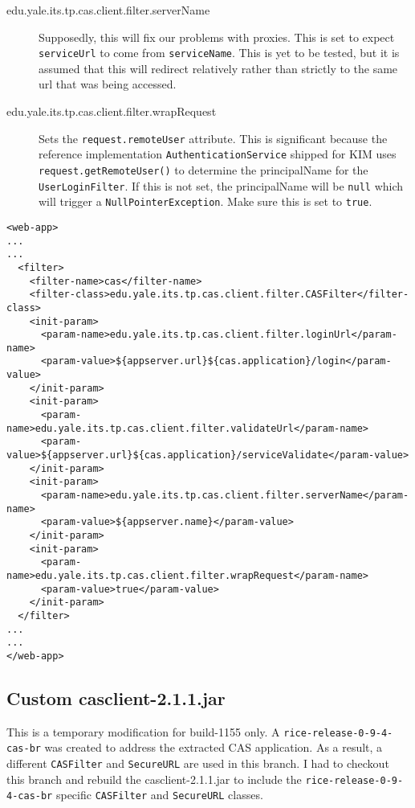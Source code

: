 \documentclass[12pt,notitlepage]{article}
\begin{document}
\begin{description}
  \item[edu.yale.its.tp.cas.client.filter.serverName] Supposedly, this will fix our problems
    with proxies. This is set to expect \verb|serviceUrl| to come from \verb|serviceName|. 
    This is yet to be tested, but it is assumed that this will redirect relatively rather than
    strictly to the same url that was being accessed.
  \item[edu.yale.its.tp.cas.client.filter.wrapRequest] Sets the \verb|request.remoteUser| attribute.
    This is significant because the reference implementation \verb|AuthenticationService| shipped
    for KIM uses \verb|request.getRemoteUser()| to determine the principalName for the \verb|UserLoginFilter|.
    If this is not set, the principalName will be \verb|null| which will trigger a 
    \verb|NullPointerException|. Make sure this is set to \verb|true|.
\end{description}

\begin{lstlisting}
<web-app>
...
...
  <filter>
	<filter-name>cas</filter-name>
	<filter-class>edu.yale.its.tp.cas.client.filter.CASFilter</filter-class>
	<init-param>
	  <param-name>edu.yale.its.tp.cas.client.filter.loginUrl</param-name>
	  <param-value>${appserver.url}${cas.application}/login</param-value>
	</init-param>
	<init-param>
	  <param-name>edu.yale.its.tp.cas.client.filter.validateUrl</param-name>
	  <param-value>${appserver.url}${cas.application}/serviceValidate</param-value>
	</init-param>
	<init-param>
	  <param-name>edu.yale.its.tp.cas.client.filter.serverName</param-name>
	  <param-value>${appserver.name}</param-value>
	</init-param>
	<init-param>
	  <param-name>edu.yale.its.tp.cas.client.filter.wrapRequest</param-name>
	  <param-value>true</param-value>
	</init-param>
  </filter>
...
...
</web-app>
\end{lstlisting}

\subsection{Custom casclient-2.1.1.jar}
This is a temporary modification for build-1155 only. A \verb|rice-release-0-9-4-cas-br| was created
to address the extracted CAS application. As a result, a different \verb|CASFilter| and \verb|SecureURL|
are used in this branch. I had to checkout this branch and rebuild the casclient-2.1.1.jar to include
the \verb|rice-release-0-9-4-cas-br| specific \verb|CASFilter| and \verb|SecureURL| classes.
\end{document}
